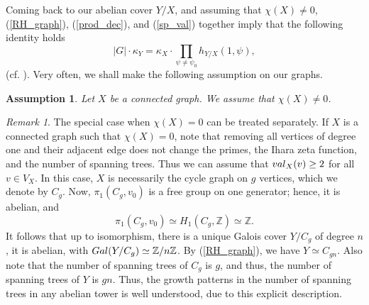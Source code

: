 \documentclass[11pt]{amsart}
\newtheorem{assumption}[theorem]{Assumption}
\numberwithin{equation}{section}
\theoremstyle{remark}
\newtheorem{remark}[theorem]{Remark}
\begin{document}
Coming back to our abelian cover $Y/X$, and assuming that $\chi(X)\neq 0$,  (\ref{RH_graph}), (\ref{prod_dec}), and (\ref{sp_val}) together imply that the following identity holds
\begin{equation} \label{class_number_formula}
|G| \cdot \kappa_{Y} = \kappa_{X} \cdot \prod_{\psi \neq \psi_{0}}h_{Y/X}(1,\psi),
\end{equation}
(cf. \cite[Equation (7)]{Vallieres:2021}).  Very often, we shall make the following assumption on our graphs.
\begin{assumption}\label{euler assumption}
Let $X$ be a connected graph.  We assume that $\chi(X) \neq 0$.
\end{assumption}
\begin{remark}
The special case when $\chi(X) = 0$ can be treated separately. If $X$ is a connected graph such that $\chi(X) = 0$, note that removing all vertices of degree one and their adjacent edge does not change the primes, the Ihara zeta function, and the number of spanning trees. Thus we can assume that ${\rm val}_{X}(v) \ge 2$ for all $v \in V_{X}$.  In this case, $X$ is necessarily the cycle graph on $g$ vertices, which we denote by $C_{g}$.  Now, $\pi_{1}(C_{g},v_{0})$ is a free group on one generator; hence, it is abelian, and 
$$\pi_{1}(C_{g},v_{0}) \simeq H_{1}(C_{g},\mathbb{Z}) \simeq \mathbb{Z}.$$
It follows that up to isomorphism, there is a unique Galois cover $Y/C_{g}$ of degree $n$, it is abelian, with ${\rm Gal}(Y/C_{g}) \simeq \mathbb{Z}/n\mathbb{Z}$.  By (\ref{RH_graph}), we have $Y \simeq C_{gn}$.  Also note that the number of spanning trees of $C_{g}$ is $g$, and thus, the number of spanning trees of $Y$ is $gn$. Thus, the growth patterns in the number of spanning trees in any abelian tower is well understood, due to this explicit description.
\end{remark}  


\end{document}
